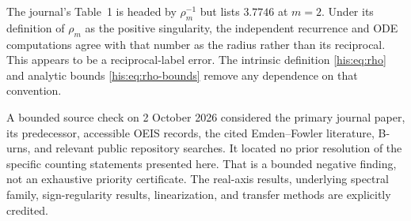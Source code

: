 \documentclass[11pt]{article}
\theoremstyle{remark}\newtheorem{remark}[theorem]{Remark}
\numberwithin{equation}{section}
\begin{document}
The journal's Table~1 is headed by $\rho_m^{-1}$ but lists $3.7746$ at $m=2$. Under its definition of $\rho_m$ as the positive singularity, the independent recurrence and ODE computations agree with that number as the radius rather than its reciprocal. This appears to be a reciprocal-label error. The intrinsic definition \eqref{his:eq:rho} and analytic bounds \eqref{his:eq:rho-bounds} remove any dependence on that convention.

A bounded source check on 2 October 2026 considered the primary journal paper, its predecessor, accessible OEIS records, the cited Emden--Fowler literature, B-urns, and relevant public repository searches. It located no prior resolution of the specific counting statements presented here. That is a bounded negative finding, not an exhaustive priority certificate. The real-axis results, underlying spectral family, sign-regularity results, linearization, and transfer methods are explicitly credited.
\end{document}
